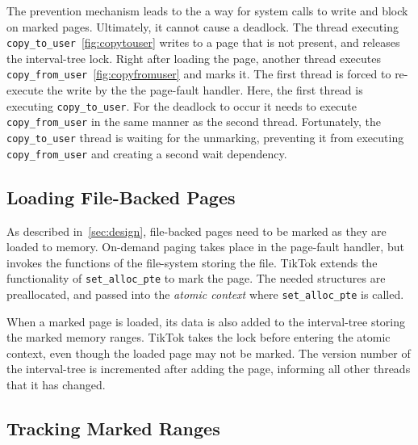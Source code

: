 \documentclass[conference]{IEEEtran}
\newcommand{\sysname}{TikTok}
\begin{document}
The prevention mechanism leads to the a way for system calls to write and block
on marked pages. Ultimately, it cannot cause a deadlock. The thread executing
\texttt{copy\_to\_user}~\autoref{fig:copytouser} writes to a page that is not
present, and releases the interval-tree lock. Right after loading the page,
another thread executes \texttt{copy\_from\_user}~\autoref{fig:copyfromuser} and
marks it. The first thread is forced to re-execute the write by the the
page-fault handler. Here, the first thread is executing \texttt{copy\_to\_user}.
For the deadlock to occur it needs to execute \texttt{copy\_from\_user} in the
same manner as the second thread. Fortunately, the \texttt{copy\_to\_user}
thread is waiting for the unmarking, preventing it from executing
\texttt{copy\_from\_user} and creating a second wait dependency.

\subsection{Loading File-Backed Pages}

As described in~\autoref{sec:design}, file-backed pages need to be marked as
they are loaded to memory. On-demand paging takes place in the page-fault
handler, but invokes the functions of the file-system storing the file. \sysname{}
extends the functionality of \texttt{set\_alloc\_pte} to mark the page. The
needed structures are preallocated, and passed into the \emph{atomic context} where 
\texttt{set\_alloc\_pte} is called.

When a marked page is loaded, its data is also added to the interval-tree
storing the marked memory ranges. \sysname{} takes the lock before entering the
atomic context, even though the loaded page may not be marked. The version
number of the interval-tree is incremented after adding the page, informing all
other threads that it has changed.

\subsection{Tracking Marked Ranges}
\end{document}
